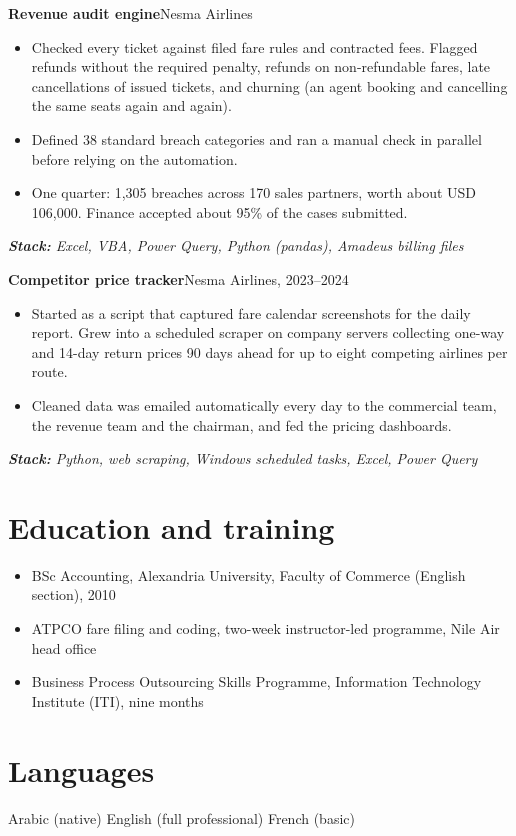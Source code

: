 \documentclass[10pt,a4paper]{article}
\newcommand{\project}[2]{\vspace{4pt}\needspace{3\baselineskip}\textbf{#1}\hfill{\small\color{muted}#2}\par}
\newcommand{\stack}[1]{{\small\itshape\color{muted}\hspace{1.1em}\textbf{Stack:} #1}\par}
\begin{document}
\project{Revenue audit engine}{Nesma Airlines}
\begin{itemize}
  \item Checked every ticket against filed fare rules and contracted fees. Flagged refunds without the required penalty, refunds on non-refundable fares, late cancellations of issued tickets, and churning (an agent booking and cancelling the same seats again and again).
  \item Defined 38 standard breach categories and ran a manual check in parallel before relying on the automation.
  \item One quarter: 1,305 breaches across 170 sales partners, worth about USD 106,000. Finance accepted about 95\% of the cases submitted.
\end{itemize}
\stack{Excel, VBA, Power Query, Python (pandas), Amadeus billing files}

\project{Competitor price tracker}{Nesma Airlines, 2023--2024}
\begin{itemize}
  \item Started as a script that captured fare calendar screenshots for the daily report. Grew into a scheduled scraper on company servers collecting one-way and 14-day return prices 90 days ahead for up to eight competing airlines per route.
  \item Cleaned data was emailed automatically every day to the commercial team, the revenue team and the chairman, and fed the pricing dashboards.
\end{itemize}
\stack{Python, web scraping, Windows scheduled tasks, Excel, Power Query}

\section{Education and training}
\begin{itemize}
  \item BSc Accounting, Alexandria University, Faculty of Commerce (English section), 2010
  \item ATPCO fare filing and coding, two-week instructor-led programme, Nile Air head office
  \item Business Process Outsourcing Skills Programme, Information Technology Institute (ITI), nine months
\end{itemize}

\section{Languages}
Arabic (native)  \textperiodcentered{}  English (full professional)  \textperiodcentered{}  French (basic)\par
\end{document}
